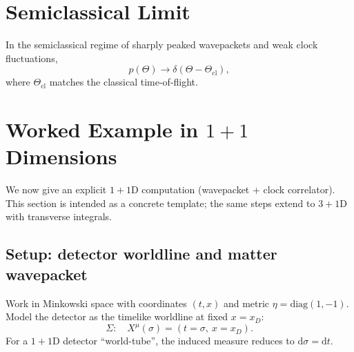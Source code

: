 \documentclass[pdflatex,sn-mathphys-num]{sn-jnl}
\theoremstyle{thmstylethree}
\theoremstyle{thmstyleone}
\theoremstyle{thmstyletwo}
\numberwithin{equation}{section}
\newcommand{\dd}{\mathrm{d}}
\newcommand{\Sig}{\Sigma}
\begin{document}
    \section{Semiclassical Limit}
    
    In the semiclassical regime of sharply peaked wavepackets and weak clock fluctuations,
    \begin{equation}
        p(\Theta)\to \delta(\Theta-\Theta_{\mathrm{cl}}),
    \end{equation}
    where $\Theta_{\mathrm{cl}}$ matches the classical time-of-flight.

    \section{Worked Example in $1+1$ Dimensions}
    
    We now give an explicit $1+1$D computation (wavepacket + clock correlator). This section is intended as a concrete template; the same steps extend to $3+1$D with transverse integrals.
    
    \subsection{Setup: detector worldline and matter wavepacket}
        
        Work in Minkowski space with coordinates $(t,x)$ and metric $\eta=\mathrm{diag}(1,-1)$. Model the detector as the timelike worldline at fixed $x=x_D$:
        \begin{equation}
            \Sig:\quad X^\mu(\sigma)=(t=\sigma,\ x=x_D).
        \end{equation}
        For a $1+1$D detector ``world-tube'', the induced measure reduces to $\dd\sigma=\dd t$.
        
\end{document}
